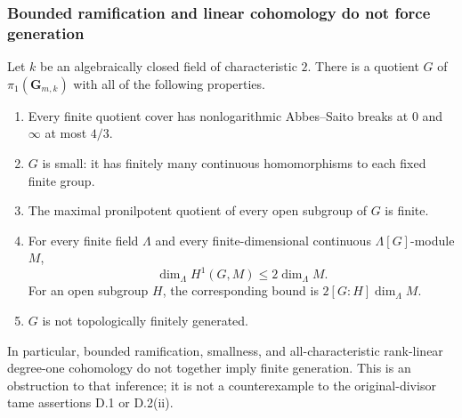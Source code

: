 \subsubsection{Bounded ramification and linear cohomology do not force generation}

\begin{proposition}
\label{D:bounded-ramification-generation-obstruction}
Let $k$ be an algebraically closed field of characteristic $2$.
There is a quotient $G$ of $\pi_1(\mathbf G_{m,k})$ with all
of the following properties.
\begin{enumerate}
\item Every finite quotient cover has nonlogarithmic
Abbes--Saito breaks at $0$ and $\infty$ at most $4/3$.
\item $G$ is small: it has finitely many continuous
homomorphisms to each fixed finite group.
\item The maximal pronilpotent quotient of every open
subgroup of $G$ is finite.
\item For every finite field $\Lambda$ and every
finite-dimensional continuous $\Lambda[G]$-module $M$,
\[
                   \dim_\Lambda H^1(G,M)\le2\dim_\Lambda M.
                                                        \tag{D.BR.1}
\]
For an open subgroup $H$, the corresponding bound is
$2[G:H]\dim_\Lambda M$.
\item $G$ is not topologically finitely generated.
\end{enumerate}
In particular, bounded ramification, smallness, and
all-characteristic rank-linear degree-one cohomology
do not together imply finite generation.
This is an obstruction to that inference; it is not
a counterexample to the original-divisor tame assertions
D.1 or D.2(ii).
\end{proposition}

